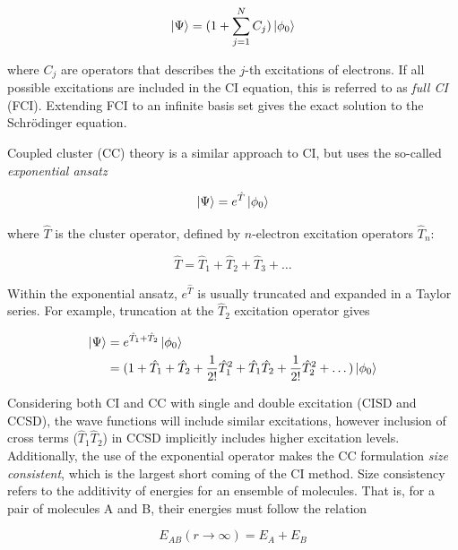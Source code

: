 \begin{equation}
  \ket{\Psi} = (1+\sum_{j=1}^N C_j) \ket{\phi_0}
\end{equation}

\noindent where $C_j$ are operators that describes the $j$-th excitations of
electrons. If all possible excitations are included in the CI equation, this is
referred to as \emph{full CI} (FCI). Extending FCI to an infinite basis set
gives the exact solution to the Schr{\"o}dinger equation.

Coupled cluster (CC) theory\cite{Crawford2000} is a similar approach to CI, but
uses the so-called \emph{exponential ansatz}

\begin{equation}
  \ket{\Psi} = e^{\hat{T}}\ket{\phi_0}
\end{equation}

\noindent where $\hat{T}$ is the cluster operator, defined by $n$-electron
excitation operators $\hat{T}_n$:

\begin{equation}
  \hat{T} = \hat{T}_1 + \hat{T}_2 + \hat{T}_3 + \dots
\end{equation}

Within the exponential ansatz, $e^{\hat{T}}$ is usually truncated and expanded
in a Taylor series. For example, truncation at the $\hat{T}_2$ excitation
operator gives

\begin{equation}
\begin{split}
  \ket{\Psi} &= e^{\hat{T}_1+\hat{T}_2}\ket{\phi_0} \\
  &= (1 + \hat{T}_1 + \hat{T}_2 +  \frac{1}{2!}\hat{T}_1^2 + \hat{T}_1\hat{T}_2 + \frac{1}{2!}\hat{T}_2^2 + \dots)
  \ket{\phi_0}
\end{split}
\end{equation}

\noindent Considering both CI and CC with single and double excitation (CISD
and CCSD), the wave functions will include similar excitations, however
inclusion of cross terms ($\hat{T}_1\hat{T}_2$) in CCSD implicitly includes
higher excitation levels. Additionally, the use of the exponential operator
makes the CC formulation \emph{size consistent}, which is the largest short
coming of the CI method. Size consistency refers to the additivity of energies
for an ensemble of molecules. That is, for a pair of molecules A and B, their
energies must follow the relation

\begin{equation}
  E_{AB}(r\rightarrow\infty) = E_A + E_B
\end{equation}

